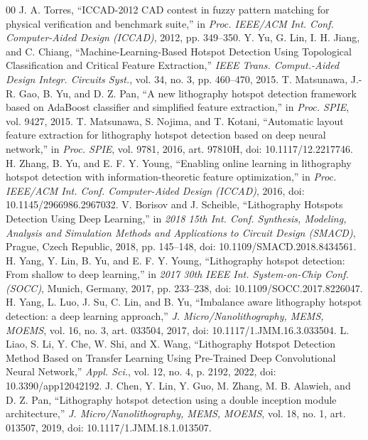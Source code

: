 \documentclass[conference]{IEEEtran}
\begin{document}
\begin{thebibliography}{00}
 J. A. Torres, ``ICCAD-2012 CAD contest in fuzzy pattern matching for physical verification and benchmark suite,'' in \emph{Proc. IEEE/ACM Int. Conf. Computer-Aided Design (ICCAD)}, 2012, pp. 349--350.
 Y. Yu, G. Lin, I. H. Jiang, and C. Chiang, ``Machine-Learning-Based Hotspot Detection Using Topological Classification and Critical Feature Extraction,'' \emph{IEEE Trans. Comput.-Aided Design Integr. Circuits Syst.}, vol. 34, no. 3, pp. 460--470, 2015.
 T. Matsunawa, J.-R. Gao, B. Yu, and D. Z. Pan, ``A new lithography hotspot detection framework based on AdaBoost classifier and simplified feature extraction,'' in \emph{Proc. SPIE}, vol. 9427, 2015.
 T. Matsunawa, S. Nojima, and T. Kotani, ``Automatic layout feature extraction for lithography hotspot detection based on deep neural network,'' in \emph{Proc. SPIE}, vol. 9781, 2016, art. 97810H, doi: 10.1117/12.2217746.
 H. Zhang, B. Yu, and E. F. Y. Young, ``Enabling online learning in lithography hotspot detection with information-theoretic feature optimization,'' in \emph{Proc. IEEE/ACM Int. Conf. Computer-Aided Design (ICCAD)}, 2016, doi: 10.1145/2966986.2967032.
 V. Borisov and J. Scheible, ``Lithography Hotspots Detection Using Deep Learning,'' in \emph{2018 15th Int. Conf. Synthesis, Modeling, Analysis and Simulation Methods and Applications to Circuit Design (SMACD)}, Prague, Czech Republic, 2018, pp. 145--148, doi: 10.1109/SMACD.2018.8434561.
 H. Yang, Y. Lin, B. Yu, and E. F. Y. Young, ``Lithography hotspot detection: From shallow to deep learning,'' in \emph{2017 30th IEEE Int. System-on-Chip Conf. (SOCC)}, Munich, Germany, 2017, pp. 233--238, doi: 10.1109/SOCC.2017.8226047.
 H. Yang, L. Luo, J. Su, C. Lin, and B. Yu, ``Imbalance aware lithography hotspot detection: a deep learning approach,'' \emph{J. Micro/Nanolithography, MEMS, MOEMS}, vol. 16, no. 3, art. 033504, 2017, doi: 10.1117/1.JMM.16.3.033504.
 L. Liao, S. Li, Y. Che, W. Shi, and X. Wang, ``Lithography Hotspot Detection Method Based on Transfer Learning Using Pre-Trained Deep Convolutional Neural Network,'' \emph{Appl. Sci.}, vol. 12, no. 4, p. 2192, 2022, doi: 10.3390/app12042192.
 J. Chen, Y. Lin, Y. Guo, M. Zhang, M. B. Alawieh, and D. Z. Pan, ``Lithography hotspot detection using a double inception module architecture,'' \emph{J. Micro/Nanolithography, MEMS, MOEMS}, vol. 18, no. 1, art. 013507, 2019, doi: 10.1117/1.JMM.18.1.013507.

\end{thebibliography}
\end{document}
